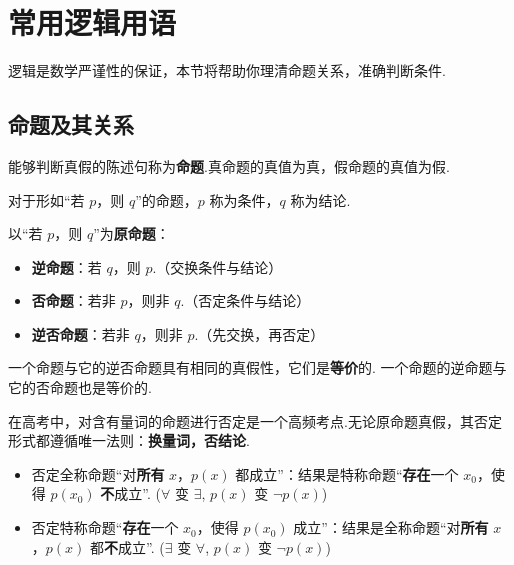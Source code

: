 	\section{常用逻辑用语}
	
	逻辑是数学严谨性的保证，本节将帮助你理清命题关系，准确判断条件.
	
	\subsection{命题及其关系}
	
	\begin{definition}[命题]
		能够判断真假的陈述句称为\textbf{命题}.真命题的真值为真，假命题的真值为假.
	\end{definition}
	
	对于形如“若 $p$，则 $q$”的命题，$p$ 称为条件，$q$ 称为结论.
	
	\begin{definition}[四种命题] 
		以“若 $p$，则 $q$”为\textbf{原命题}：
		\begin{itemize}
			\item \textbf{逆命题}：若 $q$，则 $p$.（交换条件与结论）
			\item \textbf{否命题}：若非 $p$，则非 $q$.（否定条件与结论）
			\item \textbf{逆否命题}：若非 $q$，则非 $p$.（先交换，再否定）
		\end{itemize}
	\end{definition}
	
	\begin{theorem}[命题等价关系] 
		一个命题与它的逆否命题具有相同的真假性，它们是\textbf{等价}的.
		一个命题的逆命题与它的否命题也是等价的.
	\end{theorem}
	
	\begin{note}
		在高考中，对含有量词的命题进行否定是一个高频考点.无论原命题真假，其否定形式都遵循唯一法则：\textbf{换量词，否结论}.
		\begin{itemize}
			\item 否定全称命题“对\textbf{所有} $x$，$p(x)$ 都成立”：结果是特称命题“\textbf{存在}一个 $x_0$，使得 $p(x_0)$ \textbf{不}成立”.
			($\forall$ 变 $\exists$, $p(x)$ 变 $\neg p(x)$)
			\item 否定特称命题“\textbf{存在}一个 $x_0$，使得 $p(x_0)$ 成立”：结果是全称命题“对\textbf{所有} $x$，$p(x)$ 都\textbf{不}成立”.
			($\exists$ 变 $\forall$, $p(x)$ 变 $\neg p(x)$)
		\end{itemize}
	\end{note}
	
